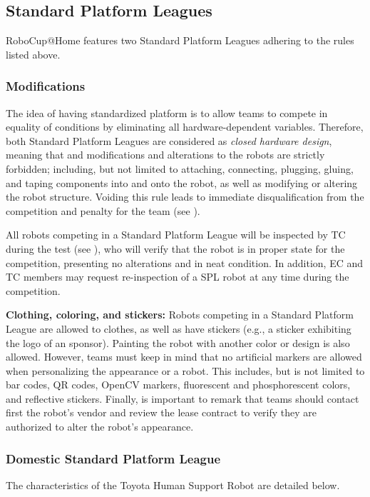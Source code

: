 \subsection{Standard Platform Leagues}
RoboCup@Home features two Standard Platform Leagues adhering to the rules listed above.

\subsubsection{Modifications}
\label{rule:spl-mods}
The idea of having standardized platform is to allow teams to compete in equality of conditions by eliminating all hardware-dependent variables. Therefore, both Standard Platform Leagues are considered as \emph{closed hardware design}, meaning that and modifications and alterations to the robots are strictly forbidden; including, but not limited to attaching, connecting, plugging, gluing, and taping components into and onto the robot, as well as modifying or altering the robot structure. Voiding this rule leads to immediate disqualification from the competition and penalty for the team (see ).

All robots competing in a Standard Platform League will be inspected by TC during the  test (see ), who will verify that the robot is in proper state for the competition, presenting no alterations and in neat condition. In addition, EC and TC members may request re-inspection of a SPL robot at any time during the competition.

\textbf{Clothing, coloring, and stickers:} Robots competing in a Standard Platform League are allowed to  clothes, as well as have stickers (e.g., a sticker exhibiting the logo of an sponsor). Painting the robot with another color or design is also allowed. However, teams must keep in mind that no artificial markers are allowed when personalizing the appearance or a robot. This includes, but is not limited to bar codes, QR codes, OpenCV markers, fluorescent and phosphorescent colors, and reflective stickers. Finally, is important to remark that teams should contact first the robot's vendor and review the lease contract to verify they are authorized to alter the robot's appearance. 

\subsubsection{Domestic Standard Platform League}
The characteristics of the Toyota Human Support Robot are detailed below. 

